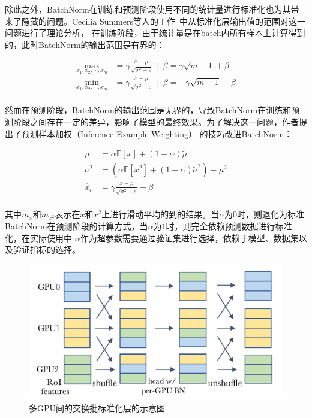 除此之外，BatchNorm在训练和预测阶段使用不同的统计量进行标准化也为其带来了隐藏的问题。Cecilia Summers等人的工作~\citep{summers2019four}中从标准化层输出值的范围对这一问题进行了理论分析，
在训练阶段，由于统计量是在batch内所有样本上计算得到的，此时BatchNorm的输出范围是有界的：

\begin{equation}
    \begin{aligned}
        \mathop {\max} \limits_{ x_1,x_2,\cdots,x_m} &= \gamma \frac{x-\mu}{\sqrt{\sigma^2+\epsilon}} + \beta = \gamma \sqrt{m-1} + \beta \\
        \mathop {\min} \limits_{ x_1,x_2,\cdots,x_m} &= \gamma \frac{x-\mu}{\sqrt{\sigma^2+\epsilon}} + \beta = -\gamma \sqrt{m-1} + \beta \\
    \end{aligned}
\end{equation}

然而在预测阶段，BatchNorm的输出范围是无界的，导致BatchNorm在训练和预测阶段之间存在一定的差异，影响了模型的最终效果。为了解决这一问题，作者提出了预测样本加权（Inference Example Weighting）
的技巧改进BatchNorm：

\begin{equation}
    \begin{aligned}
        \mu &= \alpha \mathbb{E}[x] + (1-\alpha) \tilde{\mu} \\
        \sigma^2 &= (\alpha \mathbb{E}[x^2] + (1-\alpha) \tilde{\sigma}^2) - \mu^2 \\
        \widehat{x}_i &= \gamma \frac{x-\mu}{\sqrt{\sigma^2+\epsilon}} + \beta \\
    \end{aligned}
\end{equation}

其中$m_x$和$m_{x^2}$表示在$x$和$x^2$上进行滑动平均的到的结果。当$\alpha$为$0$时，则退化为标准BatchNorm在预测阶段的计算方式，当$\alpha$为$1$时，则完全依赖预测数据进行标准化，在实际使用中
$\alpha$作为超参数需要通过验证集进行选择，依赖于模型、数据集以及验证指标的选择。

\begin{figure}
    \centering
    \includegraphics[width=\linewidth]{figures/shufflebn.png}
    \caption{多GPU间的交换批标准化层的示意图~\citep{wu2021rethinking}}
    \label{fig:shufflebn}
\end{figure}

